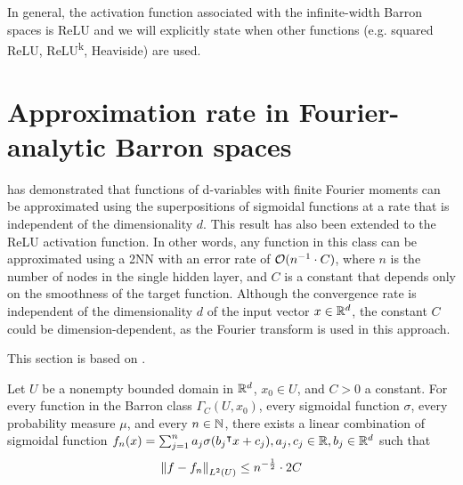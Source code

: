 In general, the activation function associated with the infinite-width Barron
spaces is ReLU and we will explicitly state when other functions (e.g. squared
ReLU, ReLU\textsuperscript{k}, Heaviside) are used.




\section{Approximation rate in Fourier-analytic Barron spaces}
\label{sec:approximation_rate_fouier}

\cite{barronUniversalApproximationBounds1993} has demonstrated that functions of
d-variables with finite Fourier moments can be approximated using the
superpositions of sigmoidal functions at a rate that is independent of the
dimensionality $d$. This result has also been extended to the ReLU activation
function. In other words, any function in this class can be approximated using a
2NN with an error rate of $\mathcal{O}(n^{-1} \cdot C)$, where $n$ is the number of
nodes in the single hidden layer, and $C$ is a constant that depends only on the
smoothness of the target function. Although the convergence rate is independent
of the dimensionality $d$ of the input vector $x \in \mathbb{R}^d$, the constant $C$
could be dimension-dependent, as the Fourier transform is used in this approach.

This section is based on \cite{barronUniversalApproximationBounds1993}.


\begin{theorem}
    \label{thm:barron_1993_1}
    Let $U$ be a nonempty bounded domain in $\mathbb{R}^d$, $x_0 \in U$, and $C > 0$ a
    constant. For every function in the Barron class $\Gamma_C(U, x_0)$, every
    sigmoidal function $\sigma$, every probability measure $\mu$, and every $n
    \in \mathbb{N}$, there exists a linear combination of sigmoidal function $f_n(x) =
    \sum_{j=1}^n a_j \sigma(b_j{}^{\intercal} x+c_j), a_j, c_j \in \mathbb{R}, b_j \in \mathbb{R}^d$ such
    that
    \begin{equation}
        \left\| f - f_n \right\|_{L^{2}(U)}\leq n^{-\frac{1}{2}} \cdot 2C
    \end{equation}
\end{theorem}

